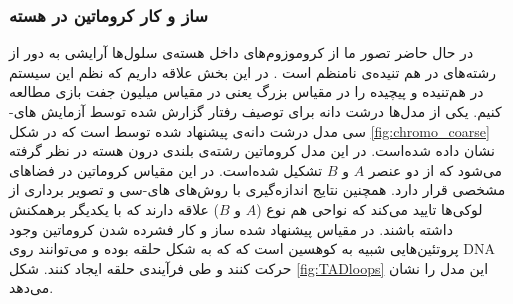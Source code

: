 \subsubsection{ساز و کار کروماتین در هسته }
در حال حاضر تصور ما از کروموزوم‌های داخل هسته‌ی سلول‌ها آرایشی به دور از رشته‌های در هم تنیده‌ی نامنظم است \cite{Gibcus:2013fj,Lieberman-Aiden289}. در این بخش علاقه داریم که نظم این سیستم در هم‌تنیده‌ و پیچیده‌ را در مقیاس بزرگ یعنی در مقیاس میلیون جفت بازی مطالعه کنیم. یکی از مدل‌ها درشت دانه برای توصیف رفتار گزارش شده توسط آزمایش های-سی  مدل درشت‌ دانه‌ی پیشنهاد شده توسط \cite{Lieberman-Aiden289} است که در شکل \ref{fig:chromo_coarse} نشان داده شده‌است. در این مدل کروماتین رشته‌ی بلندی درون هسته در نظر گرفته می‌شود که از دو عنصر $A$ و $B$ تشکیل شده‌است.   در این مقیاس کروماتین در فضاهای مشخصی قرار دارد\cite{Gibcus:2013fj,Lieberman-Aiden289}. همچنین نتایج اندازه‌گیری با روش‌های های-سی و تصویر برداری از لوکی‌ها تایید می‌کند که نواحی هم نوع ($A$ و $B$) علاقه دارند که با یکدیگر برهمکنش داشته باشند. در مقیاس پیشنهاد شده  ساز و کار فشرده شدن کروماتین وجود پروتئین‌هایی شبیه به کوهسین است که که به شکل حلقه بوده و می‌توانند روی DNA حرکت کنند و طی فرآیندی حلقه‌ ایجاد کنند\cite{Nuebler196261}. شکل \ref{fig:TADloops} این مدل را نشان می‌دهد.

